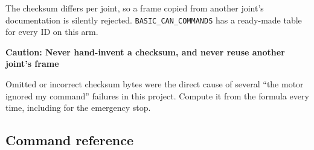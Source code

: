 \documentclass[11pt,letterpaper]{article}
\newenvironment{caution}[1]{%
    \par\addvspace{8pt}%
    \noindent{\color{cautionred}\rule{\linewidth}{0.8pt}}\par\vspace{2pt}
    \noindent\textbf{\color{cautionred}Caution: #1}\par\vspace{2pt}
}{%
    \par\vspace{2pt}\noindent{\color{cautionred}\rule{\linewidth}{0.4pt}}%
    \par\addvspace{8pt}%
}
\begin{document}
The checksum differs per joint, so a frame copied from another joint's documentation
is silently rejected. \texttt{BASIC\_CAN\_COMMANDS} has a ready-made table for every
ID on this arm.

\begin{caution}{Never hand-invent a checksum, and never reuse another joint's frame}
Omitted or incorrect checksum bytes were the direct cause of several ``the motor
ignored my command'' failures in this project. Compute it from the formula every
time, including for the emergency stop.
\end{caution}

\subsection{Command reference}
\end{document}
